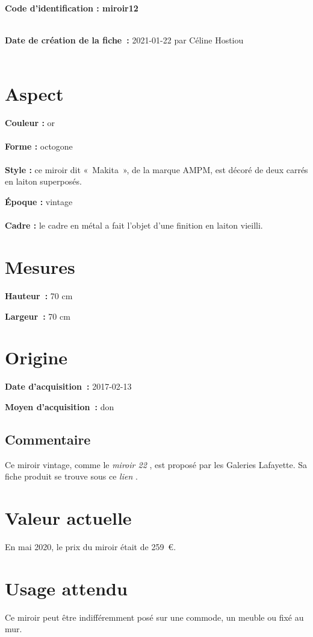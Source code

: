  
    
    
    {\bf \huge Code d’identification : miroir12}
    \\ \\ \hr
    \begin{center}
    \end{center}
    
    {\bf \large Date de création de la fiche :} 2021-01-22
    {par Céline Hostiou}
   \\ \\ \hr
    \section* {Aspect}
   {\bf \large Couleur :} or
    \\ \\ {\bf \large Forme :}  octogone
    \\ \\ {\bf \large Style :} 
            ce miroir dit « Makita », de la marque AMPM, est décoré de deux carrés en laiton superposés.
        
        {\bf \large Époque :} vintage
    \\ \\ {\bf \large Cadre :} 
            le cadre en métal a fait l’objet d'une finition en laiton vieilli.
    \section* {Mesures}
      
  {\bf \large Hauteur :} 70 cm
   
   {\bf \large Largeur :} 70 cm
     
    \section* {Origine}
    {\bf \large Date d’acquisition :} 2017-02-13

    {\bf \large Moyen d’acquisition :} don
      \subsection* {Commentaire}
       
    
Ce miroir vintage, comme le 
      {\em miroir
                22 } , est proposé par les Galeries Lafayette. Sa fiche produit se trouve sous ce  
      {\em lien } . 
    

      \section* {Valeur actuelle} En mai 2020, le prix du miroir était de 259 €.
      \section* {Usage attendu}  
    
Ce miroir peut être indifféremment posé sur une commode, un meuble ou fixé au mur. 
    

    
  